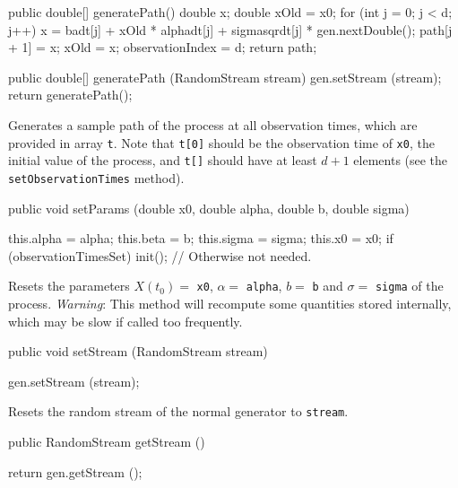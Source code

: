 \begin{hide}\begin{code}

   public double[] generatePath() {
        double x;
        double xOld = x0;
        for (int j = 0; j < d; j++) {
            x = badt[j] + xOld * alphadt[j] + sigmasqrdt[j] * gen.nextDouble();
            path[j + 1] = x;
            xOld = x;
        }
        observationIndex = d;
        return path;
    }

   public double[] generatePath (RandomStream stream) {
        gen.setStream (stream);
        return generatePath();
    }
\end{code}
\begin{tabb} Generates a sample path of the process at all observation times,
 which are provided in array \texttt{t}.
 Note that \texttt{t[0]} should be the observation time of \texttt{x0}, 
 the initial value of the process, and \texttt{t[]} should have at least $d+1$
 elements (see the \texttt{setObservationTimes} method).
\end{tabb}\end{hide}
\begin{code}

   public void setParams (double x0, double alpha, double b, double sigma) \begin{hide} { 
        this.alpha = alpha;
        this.beta  = b;
        this.sigma = sigma;
        this.x0    = x0;
        if (observationTimesSet) init(); // Otherwise not needed.
    }\end{hide}
\end{code}
\begin{tabb} 
Resets the parameters $X(t_{0}) =$ \texttt{x0}, $\alpha =$ \texttt{alpha},
 $b =$ \texttt{b} and $\sigma =$ \texttt{sigma} of the process. 
\emph{Warning}: This method will recompute some quantities stored internally, 
which may be slow if called too frequently.
\end{tabb}
\begin{code}

   public void setStream (RandomStream stream) \begin{hide} { gen.setStream (stream); }\end{hide}
\end{code}
\begin{tabb} 
Resets the random stream of the normal generator to \texttt{stream}.
\end{tabb}
\begin{code}

   public RandomStream getStream () \begin{hide} { return gen.getStream (); }\end{hide}
\end{code}
